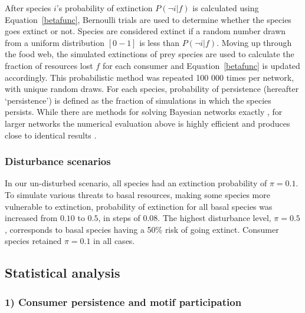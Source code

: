 \documentclass[12pt]{article}
\begin{document}
\begin{spacing}{2.0}
    		
            After species $i$'s probability of extinction $P(\lnot i|f)$ is calculated using Equation~\ref{betafunc}, Bernoulli trials are used to determine whether the species goes extinct or not. 
            Species are considered extinct if a random number drawn from a uniform distribution $[0-1]$ is less than $P(\lnot i|f)$.
            Moving up through the food web, the simulated extinctions of prey species are used to calculate the fraction of resources lost $f$ for each consumer and Equation~\ref{betafunc} is updated accordingly. 
            This probabilistic method was repeated 100 000 times per network, with unique random draws.
            For each species, probability of persistence (hereafter `persistence') is defined as the fraction of simulations in which the species persists. 
            While there are methods for solving Bayesian networks exactly \citep{Eklof2013}, for larger networks the numerical evaluation above is highly efficient and produces close to identical results \citep{Haussler2020}.
    		
    	
		
        \subsubsection*{Disturbance scenarios}
        
            In our un-disturbed scenario, all species had an extinction probability of $\pi = 0.1$. 
            To simulate various threats to basal resources, making some species more vulnerable to extinction, probability of extinction for all basal species was increased from $0.10$ to $0.5$, in steps of $0.08$. 
            The highest disturbance level, $\pi = 0.5$, corresponds to basal species having a 50\% risk of going extinct. 
            Consumer species retained $\pi=0.1$ in all cases.


	\subsection*{Statistical analysis} 
        
        \subsubsection*{1) Consumer persistence and motif participation}


\end{spacing}
\end{document}
